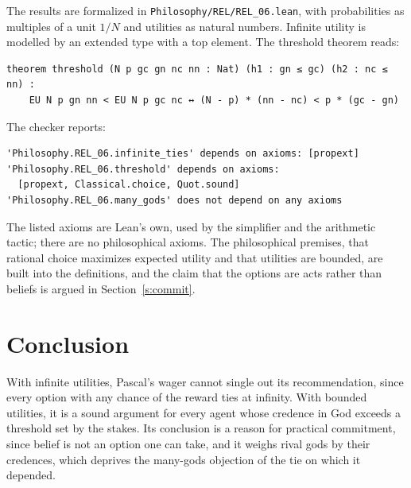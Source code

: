 \documentclass{situationist-preprint}
\begin{document}
The results are formalized in \nolinkurl{Philosophy/REL/REL_06.lean}, with probabilities as multiples of a unit $1/N$ and utilities as natural numbers. Infinite utility is modelled by an extended type with a top element. The threshold theorem reads:

\begin{lstlisting}
theorem threshold (N p gc gn nc nn : Nat) (h1 : gn ≤ gc) (h2 : nc ≤ nn) :
    EU N p gn nn < EU N p gc nc ↔ (N - p) * (nn - nc) < p * (gc - gn)
\end{lstlisting}

The checker reports:

\begin{lstlisting}
'Philosophy.REL_06.infinite_ties' depends on axioms: [propext]
'Philosophy.REL_06.threshold' depends on axioms:
  [propext, Classical.choice, Quot.sound]
'Philosophy.REL_06.many_gods' does not depend on any axioms
\end{lstlisting}

The listed axioms are Lean's own, used by the simplifier and the arithmetic tactic; there are no philosophical axioms. The philosophical premises, that rational choice maximizes expected utility and that utilities are bounded, are built into the definitions, and the claim that the options are acts rather than beliefs is argued in Section~\ref{s:commit}.

\section{Conclusion}

With infinite utilities, Pascal's wager cannot single out its recommendation, since every option with any chance of the reward ties at infinity. With bounded utilities, it is a sound argument for every agent whose credence in God exceeds a threshold set by the stakes. Its conclusion is a reason for practical commitment, since belief is not an option one can take, and it weighs rival gods by their credences, which deprives the many-gods objection of the tie on which it depended.
\end{document}
